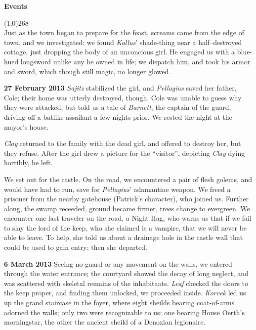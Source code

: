 \documentclass[letterpaper]{article}
\newcommand{\colline}{\line(1,0){268} \\}
\newcommand{\e}[1]{\emph{#1}}
\newcommand{\B}[1]{\textbf{#1}}
\newenvironment{notesection}[1]
{ {\huge \B{#1}} \par
\vspace{-0.75em}
\colline
\begingroup\fontsize{9pt}{12pt}\selectfont}
{\endgroup}
\begin{document}
\begin{notesection}{Events}
Just as the town began to prepare for the feast, screams came from the edge of town, and we investigated: we found \e{Kallus}' shade-thing near a half--destroyed cottage, just dropping the body of an unconcious girl.  He engaged us with a blue-hued longsword unlike any he owned in life; we dispatch him, and took his armor and sword, which though still magic, no longer glowed.

\B{27 February 2013} \e{Sajitz} stabilized the girl, and \e{Pellagius} saved her father, Cole; their home was utterly destroyed, though.  Cole was unable to guess why they were attacked, but told us a tale of \e{Barnett}, the captain of the guard, driving off a batlike assailant a few nights prior. We rested the night at the mayor's house.

\e{Clay} returned to the family with the dead girl, and offered to destroy her, but they refuse.  After the girl drew a picture for the ``visitor'', depicting \e{Clay} dying horribly, he left.

We set out for the castle. On the road, we encountered a pair of flesh golems, and would have had to run, save for \e{Pellagius}' adamantine weapon.  We freed a prisoner from the nearby gatehouse (Patrick's character), who joined us.  Further along, the swamp receeded, ground became firmer, trees change to evergreen.  We encounter one last traveler on the road, a Night Hag, who warns us that if we fail to slay the lord of the keep, who she claimed is a vampire, that we will never be able to leave. To help, she told us about a drainage hole in the castle wall that could be used to gain entry; then she departed.

\B{6 March 2013} Seeing no guard or any movement on the walls, we entered through the water entrance; the courtyard showed the decay of long neglect, and was scattered with skeletal remains of the inhabitants. \e{Leaf} checked the doors to the keep proper, and finding them unlocked, we proceeded inside.  \e{Korvek} led us up the grand staircase in the foyer, where eight sheilds bearing coat-of-arms adorned the walls; only two were recognizable to us: one bearing House Oerth's morningstar, the other the ancient sheild of a Denoxian legionaire.


\end{notesection}
\end{document}
